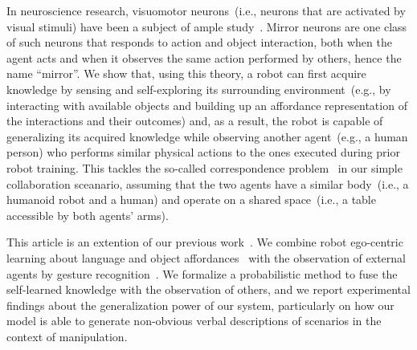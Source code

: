 In neuroscience research, visuomotor neurons~(i.e., neurons that are activated by visual stimuli) have been a subject of ample study~\cite{rizzolatti:2001:nrn}.
Mirror neurons are one class of such neurons that responds to action and object interaction, both when the agent acts and when it observes the same action performed by others, hence the name ``mirror''.
We show that, using this theory, a robot can first acquire knowledge by sensing and self-exploring its surrounding environment~(e.g., by interacting with available objects and building up an affordance representation of the interactions and their outcomes) and, as a result, the robot is capable of generalizing its acquired knowledge while observing another agent~(e.g., a human person) who performs similar physical actions to the ones executed during prior robot training.
This tackles the so-called correspondence problem~\cite{nehaniv:2002:correspondence} in our simple collaboration sceanario, assuming that the two agents have a similar body~(i.e., a humanoid robot and a human) and operate on a shared space~(i.e., a table accessible by both agents' arms).

This article is an extention of our previous work~\cite{saponaro:2017:glu}.
We combine robot ego-centric learning about language and object affordances~\cite{salvi:2012:smcb} with the observation of external agents by gesture recognition~\cite{saponaro:2013:crhri}.
We formalize a probabilistic method to fuse the self-learned knowledge with the observation of others, and we report experimental findings about the generalization power of our system, particularly on how our model is able to generate non-obvious verbal descriptions of \hri{} scenarios in the context of manipulation.



